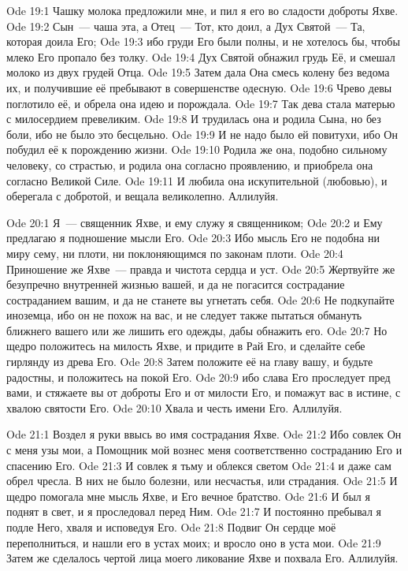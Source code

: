 \vs Ode 19:1
Чашку молока
предложили мне, и пил я его во сладости доброты Яхве.
\vs Ode 19:2
Сын~--- чаша
эта, а Отец~--- Тот, кто доил, а Дух Святой~--- Та, которая доила Его;
\vs Ode 19:3
ибо груди Его
были полны, и не хотелось бы, чтобы млеко Его пропало без толку.
\vs Ode 19:4
Дух Святой
обнажил грудь Её, и смешал молоко из двух грудей Отца.
\vs Ode 19:5
Затем дала Она
смесь колену без ведома их, и получившие её пребывают в совершенстве одесную.
\vs Ode 19:6
Чрево девы
поглотило её, и обрела она идею и порождала.
\vs Ode 19:7
Так дева стала
матерью с милосердием превеликим.
\vs Ode 19:8
И трудилась
она и родила Сына, но без боли, ибо не было это бесцельно.
\vs Ode 19:9
И не надо было
ей повитухи, ибо Он побудил её к порождению жизни.
\vs Ode 19:10
Родила же
она, подобно сильному человеку, со страстью, и родила она согласно проявлению, и
приобрела она согласно Великой Силе.
\vs Ode 19:11
И любила она
искупительной (любовью), и оберегала с добротой, и вещала великолепно.
Аллилуйя.

\vs Ode 20:1
Я~--- священник
Яхве, и ему служу я священником;
\vs Ode 20:2
и Ему
предлагаю я подношение мысли Его.
\vs Ode 20:3
Ибо мысль Его
не подобна ни миру сему, ни плоти, ни поклоняющимся по законам плоти.
\vs Ode 20:4
Приношение же
Яхве~--- правда и чистота сердца и уст.
\vs Ode 20:5
Жертвуйте же
безупречно внутренней жизнью вашей, и да не погасится сострадание состраданием
вашим, и да не станете вы угнетать себя.
\vs Ode 20:6
Не подкупайте
иноземца, ибо он не похож на вас, и не следует также пытаться обмануть ближнего
вашего или же лишить его одежды, дабы обнажить его.
\vs Ode 20:7
Но щедро
положитесь на милость Яхве, и придите в Рай Его, и сделайте себе гирлянду из
древа Его.
\vs Ode 20:8
Затем положите
её на главу вашу, и будьте радостны, и положитесь на покой Его.
\vs Ode 20:9
ибо слава Его
проследует пред вами, и стяжаете вы от доброты Его и от милости Его, и помажут
вас в истине, с хвалою святости Его.
\vs Ode 20:10
Хвала и честь
имени Его.
Аллилуйя.

\vs Ode 21:1
Воздел я руки
ввысь во имя сострадания Яхве.
\vs Ode 21:2
Ибо совлек Он
с меня узы мои, а Помощник мой вознес меня соответственно состраданию Его и
спасению Его.
\vs Ode 21:3
И совлек я
тьму и облекся светом
\vs Ode 21:4
и даже сам
обрел чресла. В них не было болезни, или несчастья, или страдания.
\vs Ode 21:5
И щедро
помогала мне мысль Яхве, и Его вечное братство.
\vs Ode 21:6
И был я поднят
в свет, и я проследовал перед Ним.
\vs Ode 21:7
И постоянно
пребывал я подле Него, хваля и исповедуя Его.
\vs Ode 21:8
Подвиг Он
сердце моё переполниться, и нашли его в устах моих; и вросло оно в уста мои.
\vs Ode 21:9
Затем же
сделалось чертой лица моего ликование Яхве и похвала Его.
Аллилуйя.

